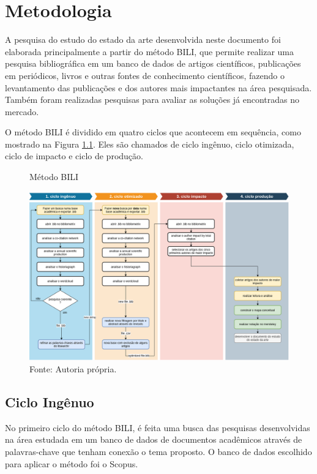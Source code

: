 \chapter{Metodologia}
\label{chap:metodologia}
A pesquisa do estudo do estado da arte desenvolvida neste documento foi elaborada principalmente a partir do método BILI, que permite realizar uma pesquisa bibliográfica em um banco de dados de artigos científicos, publicações em periódicos, livros e outras fontes de conhecimento científicos, fazendo o levantamento das publicações e dos autores mais impactantes na área pesquisada. Também foram realizadas pesquisas para avaliar as soluções já encontradas no mercado.

O método BILI é dividido em quatro ciclos que acontecem em sequência, como mostrado na Figura \ref{fig:BILI}. Eles são chamados de ciclo ingênuo, ciclo otimizada, ciclo de impacto e ciclo de produção.



\begin{figure} [h!]	
  \centering
  \caption{Método BILI}
  \includegraphics[width=1\textwidth]{Figures/bili.png}
  \caption*{Fonte: Autoria própria.}
  \label{fig:BILI}
\end{figure}

\section{Ciclo Ingênuo}
No primeiro ciclo do método BILI, é feita uma busca das pesquisas desenvolvidas na área estudada em um banco de dados de documentos acadêmicos através de palavras-chave que tenham conexão o tema proposto. O banco de dados escolhido para aplicar o método foi o Scopus.

